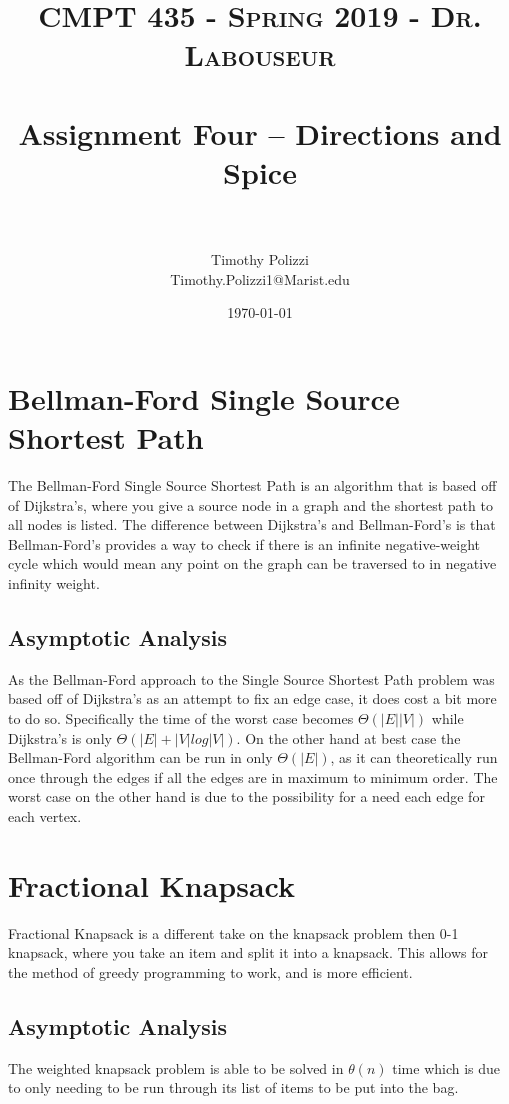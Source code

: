 \documentclass[letterpaper, 10pt]{article}
\title{	
   \normalfont \normalsize 
   \textsc{CMPT 435 - Spring 2019 - Dr. Labouseur} \\[10pt] %
   \horrule{0.5pt} \\[0.25cm] 	%
   \huge Assignment Four -- Directions and Spice\\     	    %
   \horrule{0.5pt} \\[0.25cm] 	%
}
\author{Timothy Polizzi \\ \normalsize Timothy.Polizzi1@Marist.edu}
\date{\normalsize\today} 	%
\begin{document}
\maketitle %


\noindent

\section{Bellman-Ford Single Source Shortest Path}
The Bellman-Ford Single Source Shortest Path is an algorithm that is based off of Dijkstra's, where you give a source node in a graph and the shortest path to all nodes is listed. The difference between Dijkstra's and Bellman-Ford's is that Bellman-Ford's provides a way to check if there is an infinite negative-weight cycle which would mean any point on the graph can be traversed to in negative infinity weight.

\subsection{Asymptotic Analysis}
As the Bellman-Ford approach to the Single Source Shortest Path problem was based off of Dijkstra's as an attempt to fix an edge case, it does cost a bit more to do so. Specifically the time of the worst case becomes $\Theta(|E| |V|)$ while Dijkstra's is only $\Theta(|E| + |V| log |V|)$. On the other hand at best case the Bellman-Ford algorithm can be run in only $\Theta(|E|)$, as it can theoretically run once through the edges if all the edges are in maximum to minimum order. The worst case on the other hand is due to the possibility for a need each edge for each vertex.

\section{Fractional Knapsack}
Fractional Knapsack is a different take on the knapsack problem then 0-1 knapsack, where you take an item and split it into a knapsack. This allows for the method of greedy programming to work, and is more efficient.

\subsection{Asymptotic Analysis}
The weighted knapsack problem is able to be solved in $\theta(n)$ time which is due to only needing to be run through its list of items to be put into the bag.
\end{document}
